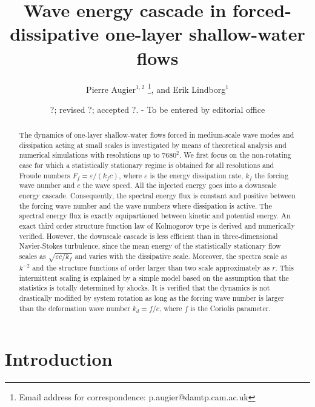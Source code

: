 \documentclass{jfm}
\title[Wave energy cascade in shallow-water flows]%
{Wave energy cascade in forced-dissipative one-layer shallow-water flows}
\author[P. Augier and E. Lindborg]%
{Pierre Augier$^{1,2}$%
  \thanks{Email address for correspondence: p.augier@damtp.cam.ac.uk},\ns
and Erik Lindborg$^1$}
\affiliation{$^1$Linn\'e Flow Centre, KTH Mechanics,
SE-100 44 Stockholm, Sweden\\[\affilskip]
$^2$Department of Applied Mathematics and Theoretical Physics,
University of Cambridge, Cambridge CB3 0WA, United Kingdom}
\date{?; revised ?; accepted ?. - To be entered by editorial office}
\newcommand{\eps}{\varepsilon}
\begin{document}
\maketitle


\begin{abstract}
The dynamics of one-layer shallow-water flows forced in medium-scale
wave modes and dissipation acting at small scales is investigated by
means of theoretical analysis and numerical simulations with
resolutions up to $7680^2$.
%
We first focus on the non-rotating case for which a statistically
stationary regime is obtained for all resolutions and Froude numbers
$F_f = \eps/(k_f c)$, where $\eps$ is the energy dissipation rate,
$k_f$ the forcing wave number and $c$ the wave speed.
%
All the injected energy goes into a downscale energy
cascade. Consequently, the spectral energy flux is constant and
positive between the forcing wave number and the wave numbers where
dissipation is active.  The spectral energy flux is exactly
equipartioned between kinetic and potential energy.  An exact third
order structure function law of Kolmogorov type is derived and
numerically verified.  However, the downscale cascade is less
efficient than in three-dimensional Navier-Stokes turbulence, since
the mean energy of the statistically stationary flow scales as
$\sqrt{\eps c /k_f}$ and varies with the dissipative scale.
%
Moreover, the spectra scale as $k^{-2}$ and the structure functions of
order larger than two scale approximately as $r$.
%
%
This intermittent scaling is explained by a simple model based on the
assumption that the statistics is totally determined by shocks.
%
It is verified that the dynamics is not drastically modified by system
rotation as long as the forcing wave number is larger than the
deformation wave number $k_d = f/c$, where $f$ is the Coriolis
parameter.
\end{abstract}


\section{Introduction}
\end{document}
